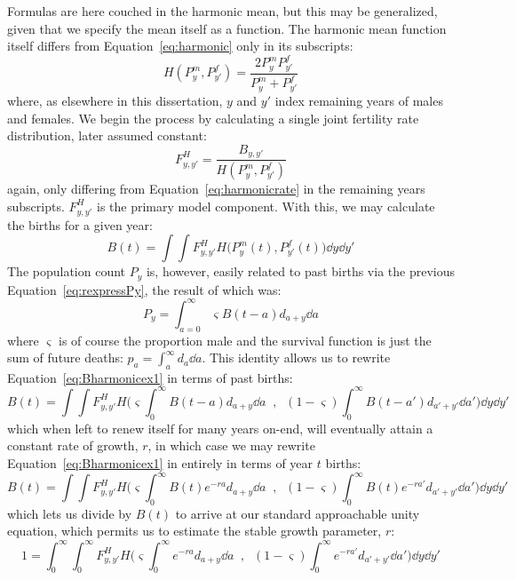 \FloatBarrier
Formulas are here couched in the harmonic
mean, but this may be generalized, given that we specify the mean itself as
a function. The harmonic mean function itself differs from
Equation~\eqref{eq:harmonic} only in its subscripts:
\begin{equation}
H(P_y^m, P_{y'}^f) = \frac{2 P_y^m P_{y'}^f}{P_y^m + P_{y'}^f}
\end{equation}
where, as elsewhere in this dissertation, $y$ and $y'$ index remaining years of
males and females. We begin the process by calculating a single joint fertility rate distribution,
later assumed constant:
 \begin{equation}
 F_{y,y'}^H = \frac{B_{y,y'}}{H(P_y^m, P_{y'}^f)}
 \end{equation}
again, only differing from Equation~\eqref{eq:harmonicrate} in the remaining
years subscripts. $F_{y,y'}^H$ is the primary model component. With this, we may
calculate the births for a given year:
 \begin{equation}
 \label{eq:Bharmonicex1}
 B(t) = \int \int F_{y,y'}^H H\Big(P_{y}^m(t), P_{y'}^f(t)\Big) \dd y \dd
 y'
 \end{equation}
The population count $P_y$ is, however, easily related to past births via the
previous Equation~\eqref{eq:rexpressPy}, the result of which was:
\begin{equation}
P_y = \int_{a=0}^\infty \varsigma B(t-a)d_{a+y} \dd a
\end{equation}
 where $\varsigma$ is of course the proportion
male and the survival function is just the sum of future deaths: $p_a = \int _a^\infty d_a \dd a$. This identity
allows us to rewrite Equation~\eqref{eq:Bharmonicex1} in terms of past births:
 \begin{equation}
 \label{eq:Bharmonicex1}
 B(t) = \int \int F_{y,y'}^H H\Bigg(\varsigma \int _0^\infty B(t-a)d_{a+y}\dd
 a\;\;,\;\; (1-\varsigma) \int _0^\infty B(t-a')d_{a'+y'} \dd a'\Bigg) \dd y \dd
 y'
 \end{equation}
which when left to renew itself for many years on-end, will eventually attain a
constant rate of growth, $r$, in which case we may rewrite
Equation~\eqref{eq:Bharmonicex1} in entirely in terms of year $t$ births:
 \begin{equation}
 \label{eq:Bharmonicex1}
 B(t) = \int \int F_{y,y'}^H H\Bigg(\varsigma \int _0^\infty
 B(t)e^{-ra}d_{a+y}\dd a\;\;,\;\; (1-\varsigma) \int _0^\infty
 B(t)e^{-ra'}d_{a'+y'} \dd a'\Bigg) \dd y \dd y'
 \end{equation}
which lets us divide by $B(t)$ to arrive at our standard approachable unity
equation, which permits us to estimate the stable growth parameter, $r$:
 \begin{equation}
 \label{eq:exMeanUnity}
 1 = \int_0^\infty \int_0^\infty F_{y,y'}^H H\Bigg(\varsigma \int _0^\infty
 e^{-ra}d_{a+y}\dd a\;\;,\;\; (1-\varsigma) \int _0^\infty
 e^{-ra'}d_{a'+y'} \dd a'\Bigg) \dd y \dd y'
 \end{equation}

 \FloatBarrier
